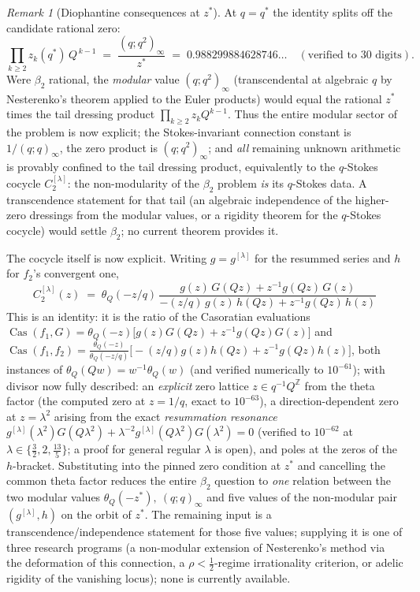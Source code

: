 \documentclass[11pt]{article}
\theoremstyle{plain}
\theoremstyle{definition}
\theoremstyle{remark}
\newtheorem{remark}[theorem]{Remark}
\newcommand{\Z}{\mathbb{Z}}
\begin{document}
\begin{remark}[Diophantine consequences at $z^\ast$]
\label{rem:zeroproduct-dioph}
At $q=q^\ast$ the identity splits off the candidate rational zero:
\[
   \prod_{k\ge2}z_k(q^\ast)\,Q^{\,k-1}\;=\;\frac{(q;q^2)_\infty}{z^\ast}
   \;=\;0.988299884628746\ldots\quad(\text{verified to }30\text{ digits}).
\]
Were $\beta_2$ rational, the \emph{modular} value $(q;q^2)_\infty$ (transcendental at algebraic $q$ by
Nesterenko's theorem applied to the Euler products) would equal the rational $z^\ast$ times the tail
dressing product $\prod_{k\ge2}z_kQ^{k-1}$. Thus the entire modular sector of the problem is now
explicit; the Stokes-invariant connection constant is $1/(q;q)_\infty$, the zero product is
$(q;q^2)_\infty$; and \emph{all} remaining unknown arithmetic is provably confined to the tail
dressing product, equivalently to the $q$-Stokes cocycle $C_2^{[\lambda]}$: the non-modularity of the
$\beta_2$ problem \emph{is} its $q$-Stokes data. A transcendence statement for that tail (an algebraic
independence of the higher-zero dressings from the modular values, or a rigidity theorem for the
$q$-Stokes cocycle) would settle $\beta_2$; no current theorem provides it.

The cocycle itself is now explicit. Writing $g=g^{[\lambda]}$ for the resummed series and $h$ for
$f_2$'s convergent one,
\[
   C_2^{[\lambda]}(z)\;=\;\theta_Q(-z/q)\,
   \frac{g(z)\,G(Qz)+z^{-1}g(Qz)\,G(z)}
        {-(z/q)\,g(z)\,h(Qz)+z^{-1}g(Qz)\,h(z)}
\]
This is an identity: it is the ratio of the Casoratian evaluations
$\operatorname{Cas}(f_1,G)=\theta_Q(-z)\bigl[g(z)G(Qz)+z^{-1}g(Qz)G(z)\bigr]$ and
$\operatorname{Cas}(f_1,f_2)=\tfrac{\theta_Q(-z)}{\theta_Q(-z/q)}
\bigl[-(z/q)g(z)h(Qz)+z^{-1}g(Qz)h(z)\bigr]$, both instances of
$\theta_Q(Qw)=w^{-1}\theta_Q(w)$ (and verified numerically to $10^{-61}$); with divisor now fully
described: an
\emph{explicit} zero lattice $z\in q^{-1}Q^{\Z}$ from the theta factor (the computed zero at
$z=1/q$, exact to $10^{-63}$), a direction-dependent zero at $z=\lambda^2$ arising from the exact
\emph{resummation resonance}
$g^{[\lambda]}(\lambda^2)G(Q\lambda^2)+\lambda^{-2}g^{[\lambda]}(Q\lambda^2)G(\lambda^2)=0$
(verified to $10^{-62}$ at $\lambda\in\{\tfrac32,2,\tfrac{13}5\}$; a proof for general regular
$\lambda$ is open),
and poles at the zeros of the $h$-bracket. Substituting into the pinned zero condition at $z^\ast$
and cancelling the common theta factor reduces the entire $\beta_2$ question to \emph{one} relation
between the two modular values $\theta_Q(-z^\ast),\ (q;q)_\infty$ and five values of the non-modular
pair $(g^{[\lambda]},h)$ on the orbit of $z^\ast$. The
remaining input is a transcendence/independence statement for those five values; supplying it is one
of three research programs (a non-modular extension of Nesterenko's method via the deformation of this
connection, a $\rho<\tfrac12$-regime irrationality criterion, or adelic rigidity
of the vanishing locus); none is currently available.
\end{remark}
\end{document}
